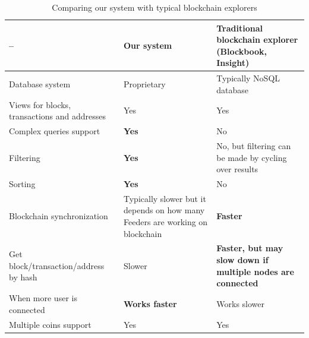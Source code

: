 \begin{table}
    \centering
    \begin{tabular}{| p{} | p{} | p{} |}
    \hline
    --                                     & \textbf{Our system}                                                                    & \textbf{Traditional blockchain explorer (Blockbook, Insight)}      \\ \hline
    Database system               & Proprietary                                                                         & Typically NoSQL database                                                        \\ \hline
    Views for blocks, transactions and addresses               & Yes                                                                         & Yes                                                        \\ \hline
    Complex queries support               & \textbf{Yes}                                                                         & No                                                        \\ \hline
    Filtering                             & \textbf{Yes}                                                                         & No, but filtering can be made by cycling over results     \\ \hline
    Sorting                               & \textbf{Yes}                                                                         & No                                                        \\ \hline
    Blockchain synchronization            & Typically slower but it depends on how many Feeders are working on blockchain & \textbf{Faster}                                                    \\ \hline
    Get block/transaction/address by hash & Slower                                                                        & \textbf{Faster, but may slow down if multiple nodes are connected} \\ \hline
    When more user is connected           & \textbf{Works faster}                                                                  & Works slower                                              \\ \hline
    Multiple coins support                & Yes                                                                          & Yes                                                \\ \hline
    \end{tabular}
    \caption{Comparing our system with typical blockchain explorers}
    \label{comparingTable}
\end{table}